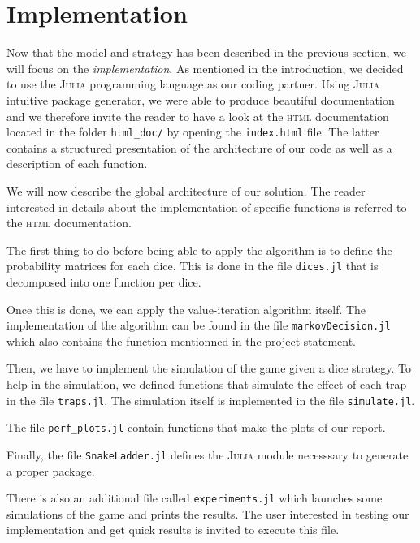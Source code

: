 \section{Implementation} %
\label{sec:implementation}
Now that the model and strategy has been described in the previous
section, we will focus on the \emph{implementation}.
As mentioned in the introduction, we decided to use the \textsc{Julia}
programming language as our coding partner.
Using \textsc{Julia} intuitive package generator, we were able to
produce beautiful documentation and we therefore invite
the reader to have a look at the \textsc{html} documentation located
in the folder \lstinline|html_doc/| by opening the \texttt{index.html} file.
The latter contains a structured presentation of the architecture
of our code as well as a description of each function.

We will now describe the global architecture of our solution. 
The reader interested in details about the implementation of
specific functions is referred to the \textsc{html} documentation. 

The first thing to do before being able to apply the algorithm
is to define the probability matrices for each dice. 
This is done in the file \texttt{dices.jl} that is decomposed into
one function per dice. 

Once this is done, we can apply the value-iteration algorithm itself. 
The implementation of the algorithm can be found in the file \texttt{markovDecision.jl}
which also contains the function mentionned in the project statement. 

Then, we have to implement the simulation of the game given a dice strategy.
To help in the simulation, we defined functions that simulate the effect
of each trap in the file \texttt{traps.jl}. The simulation itself is
implemented in the file \texttt{simulate.jl}. 

The file \texttt{perf\_plots.jl} contain functions that make the plots
of our report. 

Finally, the file \texttt{SnakeLadder.jl} defines the \textsc{Julia} module
necesssary to generate a proper package. 

There is also an additional file called \texttt{experiments.jl}
which launches some simulations of the game and prints the results.
The user interested in testing our implementation and get quick results
is invited to execute this file.

